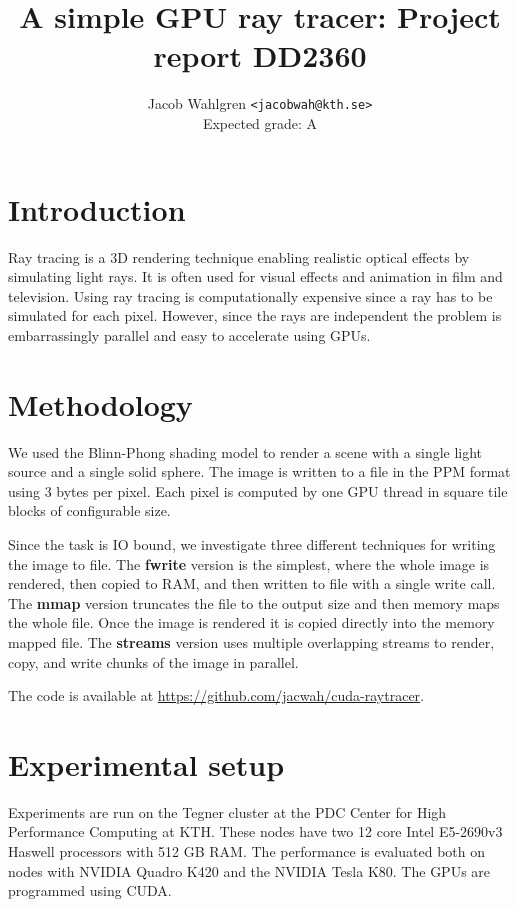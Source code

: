\documentclass{article}
\title{A simple GPU ray tracer: Project report DD2360}
\author{Jacob Wahlgren \texttt{<jacobwah@kth.se>} \\ Expected grade: A}
\begin{document}
\maketitle

\section{Introduction}

Ray tracing is a 3D rendering technique enabling realistic optical effects by
simulating light rays. It is often used for visual effects and animation in film
and television. Using ray tracing is computationally expensive since a ray has
to be simulated for each pixel. However, since the rays are independent the
problem is embarrassingly parallel and easy to accelerate using GPUs.

\section{Methodology}

We used the Blinn-Phong shading model to render a scene with a single light source
and a single solid sphere. The image is written to a file in the PPM
format using 3 bytes per pixel. Each pixel is computed by one GPU thread in
square tile blocks of configurable size.

Since the task is IO bound, we investigate three different techniques for
writing the image to file. The \textbf{fwrite} version is the simplest, where
the whole image is rendered, then copied to RAM, and then written to file with a
single write call. The \textbf{mmap} version truncates the file to the output
size and then memory maps the whole file. Once the image is rendered it is
copied directly into the memory mapped file. The \textbf{streams} version uses
multiple overlapping streams to render, copy, and write chunks of the image in
parallel.

The code is available at \url{https://github.com/jacwah/cuda-raytracer}.

\section{Experimental setup}

Experiments are run on the Tegner cluster at the PDC Center for High Performance
Computing at KTH. These nodes have two 12 core Intel E5-2690v3 Haswell
processors with 512 GB RAM. The performance is evaluated both on nodes with
NVIDIA Quadro K420 and the NVIDIA Tesla K80. The GPUs are programmed using CUDA.
\end{document}
